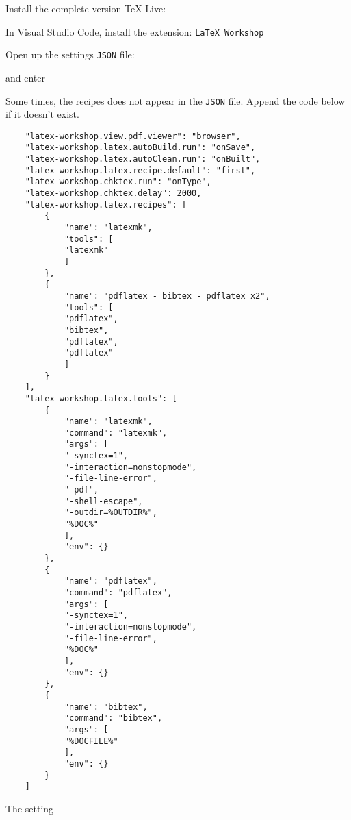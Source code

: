 
Install the complete version TeX Live:


In Visual Studio Code, install the extension: \texttt{LaTeX Workshop}


Open up the settings \texttt{JSON} file:

 and enter


Some times, the recipes does not appear in the \texttt{JSON} file. Append the code below if it doesn't exist. 


\begin{verbatim}
    "latex-workshop.view.pdf.viewer": "browser",
    "latex-workshop.latex.autoBuild.run": "onSave",
    "latex-workshop.latex.autoClean.run": "onBuilt",
    "latex-workshop.latex.recipe.default": "first",
    "latex-workshop.chktex.run": "onType",
    "latex-workshop.chktex.delay": 2000,
    "latex-workshop.latex.recipes": [
        {
            "name": "latexmk",
            "tools": [
            "latexmk"
            ]
        },
        {
            "name": "pdflatex - bibtex - pdflatex x2",
            "tools": [
            "pdflatex",
            "bibtex",
            "pdflatex",
            "pdflatex"
            ]
        }
    ],
    "latex-workshop.latex.tools": [
        {
            "name": "latexmk",
            "command": "latexmk",
            "args": [
            "-synctex=1",
            "-interaction=nonstopmode",
            "-file-line-error",
            "-pdf",
            "-shell-escape",
            "-outdir=%OUTDIR%",
            "%DOC%"
            ],
            "env": {}
        },
        {
            "name": "pdflatex",
            "command": "pdflatex",
            "args": [
            "-synctex=1",
            "-interaction=nonstopmode",
            "-file-line-error",
            "%DOC%"
            ],
            "env": {}
        },
        {
            "name": "bibtex",
            "command": "bibtex",
            "args": [
            "%DOCFILE%"
            ],
            "env": {}
        }
    ]
    \end{verbatim}


The setting


